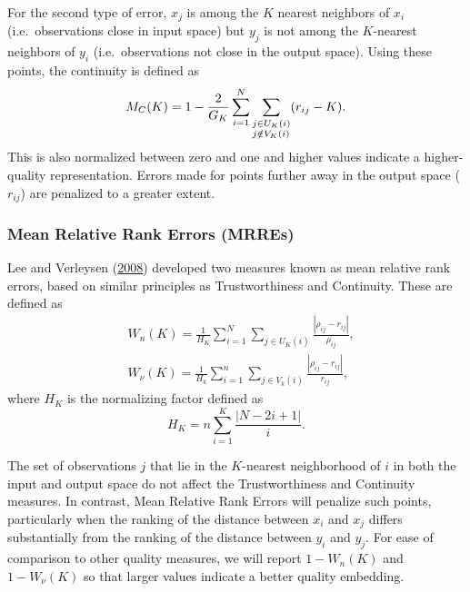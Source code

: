 \documentclass[12pt]{article}
\begin{document}
For the second type of error, \(x_j\) is among the \(K\) nearest neighbors of \(x_i\) (i.e.~observations close in input space) but \(y_j\) is not among the \(K\)-nearest neighbors of \(y_i\) (i.e.~observations not close in the output space). Using these points, the continuity is defined as
\begin{equation}\label{eq:continuity}
  M_{C}(K)=1-\frac{2}{G_{K}} \sum_{i=1}^{N} \sum_{\begin{subarray}{\ell}j \in U_{K}(i) \\j\notin V_{K}(i)\end{subarray}}(r_{ij}-K).
\end{equation}
This is also normalized between zero and one and higher values indicate a higher-quality representation. Errors made for points further away in the output space (\(r_{ij}\)) are penalized to a greater extent.

\hypertarget{mean-relative-rank-errors-mrres}{%
\subsubsection*{Mean Relative Rank Errors (MRREs)}\label{mean-relative-rank-errors-mrres}}

Lee and Verleysen (\protect\hyperlink{ref-Lee2008-cx}{2008}) developed two measures known as mean relative rank errors, based on similar principles as Trustworthiness and Continuity. These are defined as
\begin{equation}\label{eq:MRREs}
\begin{aligned}
  & W_{n}(K)=\frac{1}{H_{K}} \sum_{i=1}^{N} \sum_{j \in U_{K}(i)} \frac{|\rho_{ij}-r_{ij}|}{\rho_{ij}}, \\
  & W_{\nu}(K)=\frac{1}{H_{k}} \sum_{i=1}^{n} \sum_{j \in V_{k}(i)} \frac{|\rho_{ij}-r_{ij}|}{r_{ij}},
\end{aligned}
\end{equation}
where \(H_K\) is the normalizing factor defined as
\[
  H_{K}=n \sum_{i=1}^{K} \frac{|N-2 i+1|}{i}.
\]

The set of observations \(j\) that lie in the \(K\)-nearest neighborhood of \(i\) in both the input and output space do not affect the Trustworthiness and Continuity measures. In contrast, Mean Relative Rank Errors will penalize such points, particularly when the ranking of the distance between \(x_i\) and \(x_j\) differs substantially from the ranking of the distance between \(y_i\) and \(y_j\). For ease of comparison to other quality measures, we will report \(1-W_{n}(K)\) and \(1-W_{\nu}(K)\) so that larger values indicate a better quality embedding.
\end{document}
